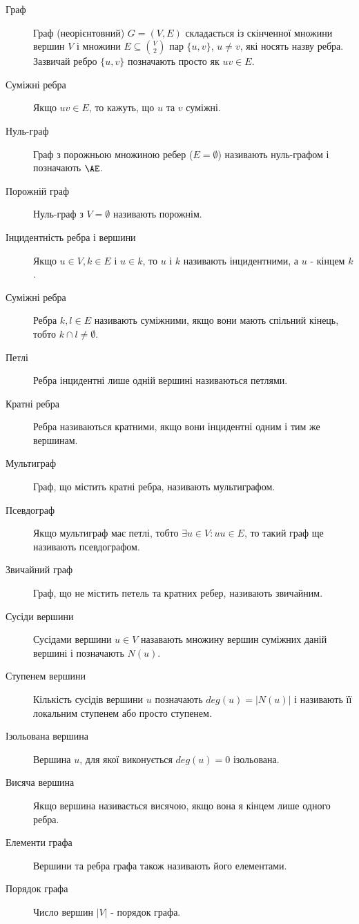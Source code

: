 \begin{description}
\item[Граф] Граф (неорієнтовний) $G = (V,E)$ складається із скінченної множини вершин $V$ і множини $E \subseteq {V \choose 2}$ пар $\{u,v\}$, $u \neq v$, які носять назву ребра.
  Зазвичай ребро $\lbrace u,v \rbrace$ позначають просто як $uv \in E$.
\item[Суміжні ребра] Якщо $uv \in E$, то кажуть, що $u$ та $v$ суміжні.
        \item[Нуль-граф] Граф з порожньою множиною ребер ($E=\emptyset$) називають нуль-графом і позначають $\AE$.
        \item[Порожній граф] Нуль-граф з $V=\emptyset$ називають порожнім.
        \item[Інцидентність ребра і вершини] Якщо $u \in V, k \in E$ і $u \in k$, то $u$ і $k$ називають інцидентними, а $u$ - кінцем $k$.
        \item[Суміжні ребра] Ребра $k,l \in E$ називають суміжними, якщо вони мають спільний кінець, тобто $k \cap l \ne \emptyset$.
        \item[Петлі] Ребра інцидентні лише одній вершині називаються петлями.
        \item[Кратні ребра] Ребра називаються кратними, якщо вони інцидентні одним і тим же вершинам.
        \item[Мультиграф] Граф, що містить кратні ребра, називають мультиграфом.
        \item[Псевдограф] Якщо мультиграф має петлі, тобто $\exists u \in V : uu \in E$, то такий граф ще називають псевдографом.
        \item[Звичайний граф] Граф, що не містить петель та кратних ребер, називають звичайним.
        \item[Сусіди вершини] Сусідами вершини $u \in V$ назавають множину вершин суміжних даній вершині і позначають $N(u)$.
        \item[Ступенем вершини] Кількість сусідів вершини $u$ позначають $deg(u) = \vert N(u) \vert$ і називають її локальним ступенем або просто ступенем.
        \item[Ізольована вершина] Вершина $u$, для якої виконується $deg(u) = 0$ ізольована.
        \item[Висяча вершина] Якщо вершина називається висячою, якщо вона я кінцем лише одного ребра.
        \item[Елементи графа] Вершини та ребра графа також називають його елементами.
        \item[Порядок графа] Число вершин $\vert V \vert$ - порядок графа.

\end{description}

